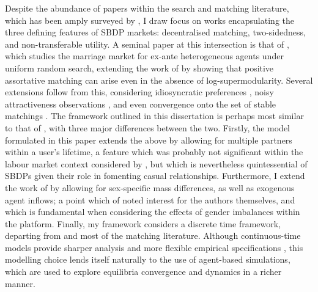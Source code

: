 Despite the abundance of papers within the search and matching literature, which has been amply surveyed by \cite{chade2017sorting}, I draw focus on works encapsulating the three defining features of SBDP markets: decentralised matching, two-sidedness, and non-transferable utility. 
A seminal paper at this intersection is that of \cite{burdett1997marriage}, which studies the marriage market for ex-ante heterogeneous agents under uniform random search, extending the work of \cite{becker1973theory} by showing that positive assortative matching can arise even in the absence of log-supermodularity.
Several extensions follow from this, considering idiosyncratic preferences \citep{burdett1998two}, noisy attractiveness observations \citep{chade2006matching}, and even convergence onto the set of stable matchings \citep{adachi2003search}. 
The framework outlined in this dissertation is perhaps most similar to that of \cite{burdett1998two}, with three major differences between the two. 
Firstly, the model formulated in this paper extends the above by allowing for multiple partners within a user's lifetime, a feature which was probably not significant within the labour market context considered by \cite{burdett1998two}, but which is nevertheless quintessential of SBDPs given their role in fomenting casual relationships.
Furthermore, I extend the work of \citeauthor{burdett1998two} by allowing for sex-specific mass differences, as well as exogenous agent inflows; a point which of noted interest for the authors themselves, and which is fundamental when considering the effects of gender imbalances within the platform. 
Finally, my framework considers a discrete time framework, departing from \cite{burdett1998two} and most of the matching literature. 
Although continuous-time models provide sharper analysis and more flexible empirical specifications \citep{burdett1999long}, this modelling choice lends itself naturally to the use of agent-based simulations, which are used to explore equilibria convergence and dynamics in a richer manner. 

